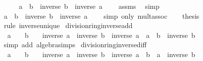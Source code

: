 \begin{isabellebody}
%
\isadelimproof
%
\endisadelimproof
%
\isatagproof
{}\isamarkupfalse%
\ {\isacharminus}{\kern0pt}\isanewline
\ \ \isamarkupfalse%
\ {\isachardoublequoteopen}a\ {\isacharasterisk}{\kern0pt}\ {\isacharparenleft}{\kern0pt}b\ {\isacharasterisk}{\kern0pt}\ inverse\ b{\isacharparenright}{\kern0pt}\ {\isacharasterisk}{\kern0pt}\ inverse\ a\ {\isacharequal}{\kern0pt}\ {}{\isachardoublequoteclose}\ \isamarkupfalse%
\ assms\ \isamarkupfalse%
\ simp\isanewline
\ \ \isamarkupfalse%
\ {\isachardoublequoteopen}a\ {\isacharasterisk}{\kern0pt}\ b\ {\isacharasterisk}{\kern0pt}\ {\isacharparenleft}{\kern0pt}inverse\ b\ {\isacharasterisk}{\kern0pt}\ inverse\ a{\isacharparenright}{\kern0pt}\ {\isacharequal}{\kern0pt}\ {}{\isachardoublequoteclose}\ \isamarkupfalse%
\ {\isacharparenleft}{\kern0pt}simp\ only{\isacharcolon}{\kern0pt}\ mult{\isachardot}{\kern0pt}assoc{\isacharparenright}{\kern0pt}\isanewline
\ \ \isamarkupfalse%
\ {\isacharquery}{\kern0pt}thesis\ \isamarkupfalse%
\ {\isacharparenleft}{\kern0pt}rule\ inverse{\isacharunderscore}{\kern0pt}unique{\isacharparenright}{\kern0pt}\isanewline
{}\isamarkupfalse%
%
\endisatagproof
{\isafoldproof}%
%
\isadelimproof
\isanewline
%
\endisadelimproof
\isanewline
{}\isamarkupfalse%
\ division{\isacharunderscore}{\kern0pt}ring{\isacharunderscore}{\kern0pt}inverse{\isacharunderscore}{\kern0pt}add{\isacharcolon}{\kern0pt}\isanewline
\ \ {\isachardoublequoteopen}a\ {\isasymnoteq}\ {}\ {\isasymLongrightarrow}\ b\ {\isasymnoteq}\ {}\ {\isasymLongrightarrow}\ inverse\ a\ {\isacharplus}{\kern0pt}\ inverse\ b\ {\isacharequal}{\kern0pt}\ inverse\ a\ {\isacharasterisk}{\kern0pt}\ {\isacharparenleft}{\kern0pt}a\ {\isacharplus}{\kern0pt}\ b{\isacharparenright}{\kern0pt}\ {\isacharasterisk}{\kern0pt}\ inverse\ b{\isachardoublequoteclose}\isanewline
%
\isadelimproof
%
\endisadelimproof
%
\isatagproof
{}\isamarkupfalse%
\ {\isacharparenleft}{\kern0pt}simp\ add{\isacharcolon}{\kern0pt}\ algebra{\isacharunderscore}{\kern0pt}simps{\isacharparenright}{\kern0pt}%
\endisatagproof
{\isafoldproof}%
%
\isadelimproof
\isanewline
%
\endisadelimproof
\isanewline
{}\isamarkupfalse%
\ division{\isacharunderscore}{\kern0pt}ring{\isacharunderscore}{\kern0pt}inverse{\isacharunderscore}{\kern0pt}diff{\isacharcolon}{\kern0pt}\isanewline
\ \ {\isachardoublequoteopen}a\ {\isasymnoteq}\ {}\ {\isasymLongrightarrow}\ b\ {\isasymnoteq}\ {}\ {\isasymLongrightarrow}\ inverse\ a\ {\isacharminus}{\kern0pt}\ inverse\ b\ {\isacharequal}{\kern0pt}\ inverse\ a\ {\isacharasterisk}{\kern0pt}\ {\isacharparenleft}{\kern0pt}b\ {\isacharminus}{\kern0pt}\ a{\isacharparenright}{\kern0pt}\ {\isacharasterisk}{\kern0pt}\ inverse\ b{\isachardoublequoteclose}\isanewline

\end{isabellebody}

